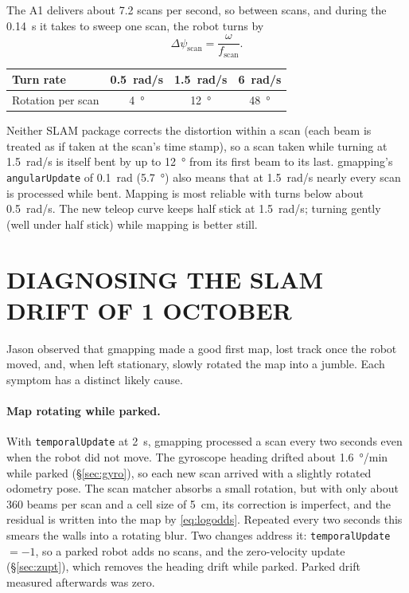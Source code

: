 The A1 delivers about 7.2 scans per second, so between scans, and during the
\SI{0.14}{s} it takes to sweep one scan, the robot turns by
\begin{equation}
\Delta\psi_{\mathrm{scan}} = \frac{\omega}{f_{\mathrm{scan}}}.
\end{equation}
\begin{center}
\small
\begin{tabular}{lccc}
\toprule
Turn rate & \SI{0.5}{rad/s} & \SI{1.5}{rad/s} & \SI{6}{rad/s} \\
\midrule
Rotation per scan & \SI{4}{\degree} & \SI{12}{\degree} & \SI{48}{\degree} \\
\bottomrule
\end{tabular}
\end{center}
Neither SLAM package corrects the distortion within a scan (each beam is
treated as if taken at the scan's time stamp), so a scan taken while turning
at \SI{1.5}{rad/s} is itself bent by up to \SI{12}{\degree} from its first
beam to its last. gmapping's \texttt{angularUpdate} of \SI{0.1}{rad}
(\SI{5.7}{\degree}) also means that at \SI{1.5}{rad/s} nearly every scan is
processed while bent. Mapping is most reliable with turns below about
\SI{0.5}{rad/s}. The new teleop curve keeps half stick at
\SI{1.5}{rad/s}; turning gently (well under half stick) while mapping is
better still.

\section{DIAGNOSING THE SLAM DRIFT OF 1 OCTOBER}
\label{sec:slamdiag}

Jason observed that gmapping made a good first map, lost track once the robot
moved, and, when left stationary, slowly rotated the map into a jumble. Each
symptom has a distinct likely cause.

\paragraph{Map rotating while parked.} With \texttt{temporalUpdate} at
\SI{2}{s}, gmapping processed a scan every two seconds even when the robot did
not move. The gyroscope heading drifted about \SI{1.6}{\degree/min} while
parked (\S\ref{sec:gyro}), so each new scan arrived with a slightly rotated
odometry pose. The scan matcher absorbs a small rotation, but with only
about 360 beams per scan and a cell size of \SI{5}{cm}, its correction is
imperfect, and the residual is written into the map by \eqref{eq:logodds}.
Repeated every two seconds this smears the walls into a rotating blur. Two
changes address it:
\texttt{temporalUpdate} $=-1$, so a parked robot adds no scans, and the
zero-velocity update (\S\ref{sec:zupt}), which removes the heading drift
while parked. Parked drift measured afterwards was zero.

